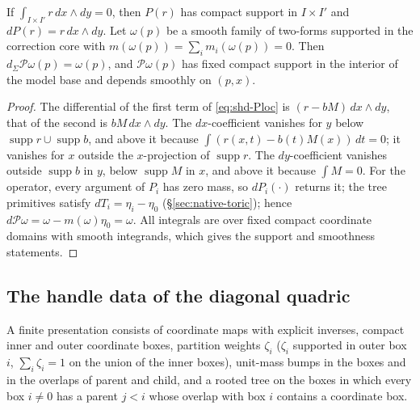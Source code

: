 \begin{lemma}\label{lem:shd-primitive}
If $\int_{I\times I'}r\,dx\wedge dy=0$, then $P(r)$ has compact support in $I\times I'$ and $dP(r)=r\,dx\wedge dy$. Let
$\omega(p)$ be a smooth family of two-forms supported in the correction core with $m(\omega(p))=\sum_im_i(\omega(p))=0$.
Then $d_\Sigma\mathcal P\omega(p)=\omega(p)$, and $\mathcal P\omega(p)$ has fixed compact support in the interior of the
model base and depends smoothly on $(p,x)$.
\end{lemma}
\begin{proof}
The differential of the first term of \eqref{eq:shd-Ploc} is $(r-bM)\,dx\wedge dy$, that of the second is
$bM\,dx\wedge dy$. The $dx$-coefficient vanishes for $y$ below $\operatorname{supp}r\cup\operatorname{supp}b$, and above it
because $\int(r(x,t)-b(t)M(x))\,dt=0$; it vanishes for $x$ outside the $x$-projection of $\operatorname{supp}r$. The
$dy$-coefficient vanishes outside $\operatorname{supp}b$ in $y$, below $\operatorname{supp}M$ in $x$, and above it because
$\int M=0$. For the operator, every argument of $P_i$ has zero mass, so $dP_i(\cdot)$ returns it; the tree primitives
satisfy $dT_i=\eta_i-\eta_0$ (\S\ref{sec:native-toric}); hence
$d\mathcal P\omega=\omega-m(\omega)\eta_0=\omega$. All integrals are over fixed compact coordinate domains with smooth
integrands, which gives the support and smoothness statements.
\end{proof}

\subsection{The handle data of the diagonal quadric}\label{sec:shd-handle-data}

\begin{definition}\label{def:shd-presentation}
A finite presentation consists of coordinate maps with explicit inverses, compact inner and outer coordinate boxes,
partition weights $\zeta_i$ ($\zeta_i$ supported in outer box $i$, $\sum_i\zeta_i=1$ on the union of the inner boxes),
unit-mass bumps in the boxes and in the overlaps of parent and child, and a rooted tree on the boxes in which every
box $i\ne0$ has a parent $j<i$ whose overlap with box $i$ contains a coordinate box.
\end{definition}

